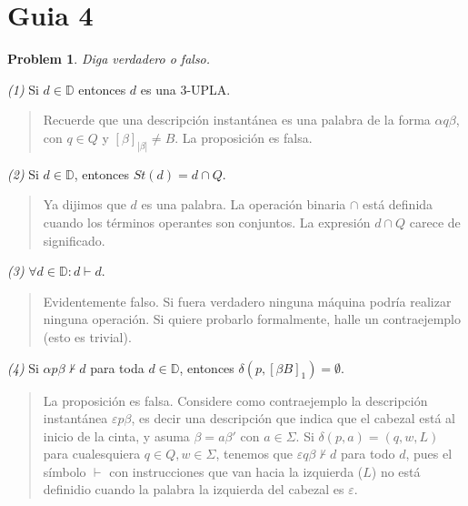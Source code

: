 \documentclass[a4paper, 12pt]{article}
\newtheorem{problem}{Problem}
\newtheorem{problem}{Problem}
\begin{document}
\pagebreak
\section{Guia 4}

\begin{problem}
    Diga verdadero o falso.
\end{problem}

\textit{(1)} Si $d \in \mathbb{D}$ entonces $d$ es una 3-UPLA.


\small
\begin{quote}

Recuerde que una descripción instantánea es una palabra de la forma $\alpha q
\beta$, con $q \in Q$ y $[\beta]_{|\beta|} \neq B$. La proposición es falsa. 


\end{quote}
\normalsize

\textit{(2)} Si $d \in \mathbb{D}$, entonces $St(d) = d \cap  Q$.


\small
\begin{quote}

Ya dijimos que $d$ es una palabra. La operación binaria $\cap $ está definida
cuando los términos operantes son conjuntos. La expresión $d \cap Q$ carece de
significado.

\end{quote}
\normalsize

\textit{(3)} $\forall d \in \mathbb{D} : d \vdash d$.


\small
\begin{quote}

Evidentemente falso. Si fuera verdadero ninguna máquina podría realizar ninguna
operación. Si quiere probarlo formalmente, halle un contraejemplo (esto es
trivial).

\end{quote}
\normalsize

\textit{(4)} Si $\alpha p \beta \not\vdash d$ para toda $d \in \mathbb{D}$,
entonces $\delta(p, \left[ \beta B\right]_1 ) = \emptyset$.


\small
\begin{quote}

    La proposición es falsa. Considere como contraejemplo la descripción
    instantánea $\varepsilon  p \beta$, es decir una descripción que indica que el
    cabezal está al inicio de la cinta, y asuma $\beta = a\beta'$ con $a \in
    \Sigma$. Si $\delta(p, a) = (q, w, L)$ para cualesquiera $q \in Q, w \in
    \Sigma$, tenemos que $\varepsilon q\beta \not\vdash d$ para todo $d$, pues
    el símbolo $\vdash $  con instrucciones que van hacia la izquierda ($L$) no
    está definidio cuando la palabra la izquierda del cabezal es $\varepsilon $.

\end{quote}
\normalsize
\end{document}
